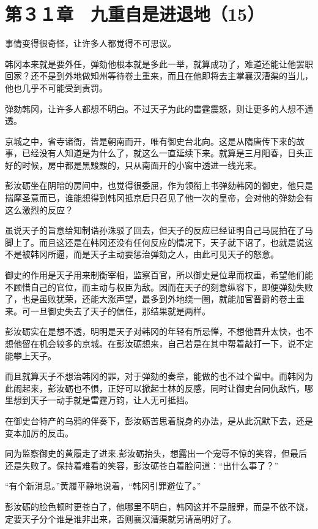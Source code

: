 \section{第３１章　九重自是进退地（15）}

事情变得很奇怪，让许多人都觉得不可思议。

韩冈本来就是要外任，弹劾他根本就是多此一举，就算成功了，难道还能让他罢职回家？还不是到外地做知州等待卷土重来，而且在他即将去主掌襄汉漕渠的当儿，他也几乎不可能受到责罚。

弹劾韩冈，让许多人都想不明白。不过天子为此的雷霆震怒，则让更多的人想不通透。

京城之中，省寺诸衙，皆是朝南而开，唯有御史台北向。这是从隋唐传下来的故事，已经没有人知道是为什么了，就这么一直延续下来。就算是三月阳春，日头正好的时候，房中都是黑黢黢的，只从南面开的小窗中透进一线光来。

彭汝砺坐在阴暗的房间中，也觉得很委屈，作为领衔上书弹劾韩冈的御史，他只是揣摩圣意而已，谁能想得到韩冈抵京后只召见了他一次的皇帝，会对他的弹劾会有这么激烈的反应？

虽说天子的旨意给知制诰孙洙驳了回去，但天子的反应已经证明自己马屁拍在了马脚上了。而且这还是在韩冈还没有任何反应的情况下，天子就下诏了，也就是说这不是被韩冈所逼，而是天子主动要惩治弹劾之人，由此可见天子的怒意。

御史的作用是天子用来制衡宰相，监察百官，所以御史是位卑而权重，希望他们能不顾惜自己的官位，而主动与权臣为敌。因而在天子的刻意纵容下，即便弹劾失败了，也是虽败犹荣，还能大涨声望，最多到外地绕一圈，就能加官晋爵的卷土重来。可一旦御史失去了天子的信任，那结果就是两样。

彭汝砺实在是想不透，明明是天子对韩冈的年轻有所忌惮，不想他晋升太快，也不想他留在机会较多的京城。在彭汝砺想来，自己若是在其中帮着敲打一下，说不定能攀上天子。

而且就算天子不想治韩冈的罪，对于弹劾的奏章，能做的也不过个留中。而韩冈为此闹起来，彭汝砺也不惧，正好可以掀起士林的反感，同时让御史台同仇敌忾，哪里想到天子一动手就是雷霆万钧，让人无可抵挡。

在御史台特产的乌鸦的伴奏下，彭汝砺苦思着脱身的办法，是从此沉默下去，还是变本加厉的反击。

同为监察御史的黄履走了进来.彭汝砺抬头，想露出一个宠辱不惊的笑容，但最后还是失败了。保持着难看的笑容，彭汝砺苍白着脸问道：“出什么事了？”

“有个新消息。”黄履平静地说着，“韩冈引罪避位了。”

彭汝砺的脸色顿时更苍白了，他哪里不明白，韩冈这并不是服罪，而是不依不饶，定要天子分个谁是谁非出来，否则襄汉漕渠就另请高明好了。

